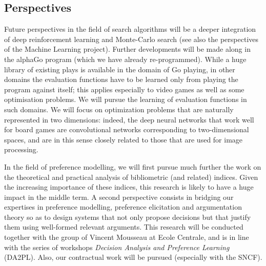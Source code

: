 
 

\subsection{Perspectives}

Future perspectives in the field of search algorithms will be a deeper integration of deep reinforcement learning and Monte-Carlo search (see also the perspectives of the Machine Learning project). Further developments will be made along in the alphaGo program (which we have already re-programmed).  While a huge library of existing plays is available in the domain of Go playing, in other domains the evaluation functions have to  be learned only from playing the program against itself; this applies especially to video games as well as some optimisation problems. We will pursue the learning of evaluation functions in such domains. We will focus on optimization problems that are naturally represented in two dimensions: indeed, the deep neural networks that work well for board games are convolutional networks corresponding to two-dimensional spaces, and are in this sense closely related to those that are used for image processing. 

In the field of preference modelling, we will first pursue much further the work on the theoretical and practical analysis of bibliometric (and related) indices.  Given the increasing importance of these indices, this research is likely to have a huge impact in the middle term. A second perspective consists in bridging our expertises in preference modelling, preference elicitation and argumentation theory so as to design systems that not only propose decisions but that justify them using well-formed relevant arguments. 
This research will be conducted together with the group of Vincent Mousseau at Ecole Centrale, and is in line with the series of workshops {\em Decision Analysis and Preference Learning} (DA2PL). Also, our contractual work will be pursued (especially with the SNCF).

